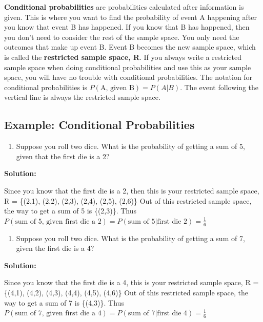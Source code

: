\documentclass[]{book}
\providecommand{\tightlist}{%
  \setlength{\itemsep}{0pt}\setlength{\parskip}{0pt}}
\begin{document}
\textbf{Conditional probabilities} are probabilities calculated after information is given. This is where you want to find the probability of event A happening after you know that event B has happened. If you know that B has happened, then you don't need to consider the rest of the sample space. You only need the outcomes that make up event B. Event B becomes the new sample space, which is called the \textbf{restricted sample space, R}. If you always write a restricted sample space when doing conditional probabilities and use this as your sample space, you will have no trouble with conditional probabilities. The notation for conditional probabilities is \(P(\text{A, given B})=P(A|B)\). The event following the vertical line is always the restricted sample space.

\hypertarget{example-conditional-probabilities}{%
\subsection{Example: Conditional Probabilities}\label{example-conditional-probabilities}}

\begin{enumerate}
\def\labelenumi{\alph{enumi}.}
\tightlist
\item
  Suppose you roll two dice. What is the probability of getting a sum
  of 5, given that the first die is a 2?
\end{enumerate}

\textbf{Solution:}

Since you know that the first die is a 2, then this is your
restricted sample space, R = \{(2,1), (2,2), (2,3), (2,4), (2,5), (2,6)\}
Out of this restricted sample space, the way to get a sum of 5 is
\{(2,3)\}. Thus \(P(\text{sum of 5, given first die a 2})=P(\text{sum of 5}|\text{first die 2})=\frac{1}{6}\)

\begin{enumerate}
\def\labelenumi{\alph{enumi}.}
\setcounter{enumi}{1}
\tightlist
\item
  Suppose you roll two dice. What is the probability of getting a sum
  of 7, given the first die is a 4?
\end{enumerate}

\textbf{Solution:}

Since you know that the first die is a 4, this is your restricted
sample space, R = \{(4,1), (4,2), (4,3), (4,4), (4,5), (4,6)\}
Out of this restricted sample space, the way to get a sum of 7 is
\{(4,3)\}. Thus \(P(\text{sum of 7, given first die a 4})=P(\text{sum of 7}|\text{first die 4})=\frac{1}{6}\)
\end{document}
